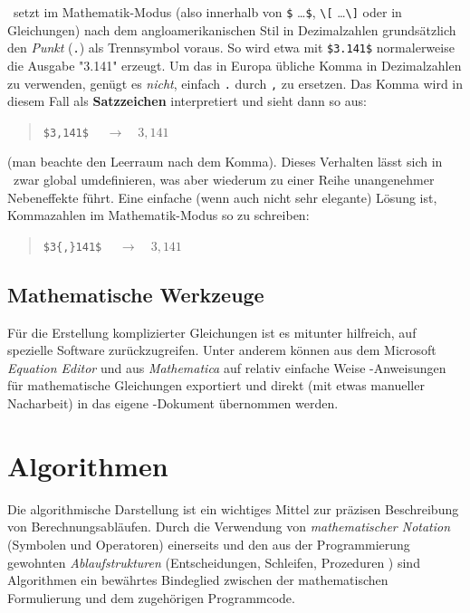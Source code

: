 \latex\ setzt im Mathematik-Modus (also innerhalb von \verb!$! \ldots \verb!$!,
\verb!\[! \ldots \verb!\]! oder in Gleichungen) nach dem angloamerikanischen
Stil in Dezimalzahlen grundsätzlich den \emph{Punkt} (\verb!.!) als Trennsymbol
voraus. So wird etwa mit \verb!$3.141$! normalerweise die Ausgabe "3.141"
erzeugt. Um das in Europa übliche Komma in Dezimalzahlen zu verwenden, genügt
es \emph{nicht}, einfach \verb!.! durch \verb!,! zu ersetzen. Das Komma wird
in diesem Fall als \textbf{Satzzeichen} interpretiert und sieht dann so aus:
%
\begin{quote}
	\verb!$3,141$! $\quad \rightarrow \quad 3,141$
\end{quote}
%
(man beachte den Leerraum nach dem Komma). Dieses Verhalten lässt sich in
\latex\ zwar global umdefinieren, was aber wiederum zu einer Reihe
unangenehmer Nebeneffekte führt. Eine einfache (wenn auch nicht sehr
elegante) Lösung ist, Kommazahlen im Mathematik-Modus so zu schreiben:
%
\begin{quote}
	\verb!$3{,}141$! $\quad \rightarrow \quad 3{,}141$
\end{quote}


\subsection{Mathematische Werkzeuge}

Für die Erstellung komplizierter Gleichungen ist es mitunter hilfreich, auf
spezielle Software zurückzugreifen. Unter anderem können aus dem Microsoft
\emph{Equation Editor} und aus {\em Mathematica} auf relativ einfache Weise
\latex-An\-wei\-sun\-gen für mathematische Gleichungen exportiert und direkt
(mit etwas manueller Nacharbeit) in das eigene \latex-Dokument übernommen
werden.


\section{Algorithmen}

Die algorithmische Darstellung ist ein wichtiges Mittel zur präzisen
Beschreibung von Berechnungsabläufen. Durch die Verwendung von
\emph{mathematischer Notation} (Symbolen und Operatoren) einerseits und den
aus der Programmierung gewohnten \emph{Ablaufstrukturen} (Entscheidungen,
Schleifen, Prozeduren \etc) sind Algorithmen ein bewährtes Bindeglied
zwischen der mathematischen Formulierung und dem zugehörigen Programmcode.

